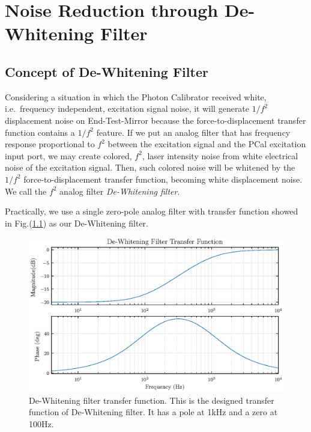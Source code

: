 

\chapter{Noise Reduction through De-Whitening Filter}

\section{Concept of De-Whitening Filter}
Considering a situation in which the Photon Calibrator received white, i.e.~frequency independent, excitation signal noise, it will generate $1/f^2$ displacement noise on End-Test-Mirror because the force-to-displacement transfer function contains a $1/f^2$ feature. If we put an analog filter that has frequency response proportional to $f^2$ between the excitation signal and the PCal excitation input port, we may create colored, $f^2$, laser intensity noise from white electrical noise of the excitation signal. Then, such colored noise will be whitened by the $1/f^2$ force-to-displacement transfer function, becoming white displacement noise. We call the $f^2$ analog filter \emph{De-Whitening filter}.


Practically, we use a single zero-pole analog filter with transfer function showed in Fig.(\ref{fig:DEWtf_design}) as our De-Whitening filter. 

\begin{figure}[hbt!]
\centering
\includegraphics[width=1\textwidth]{figure/DEWtf_design}
\caption[De-Whitening filter transfer function]{De-Whitening filter transfer function. This is the designed transfer function of De-Whitening filter. It has a pole at 1kHz and a zero at 100Hz. }
\label{fig:DEWtf_design}
\end{figure}





